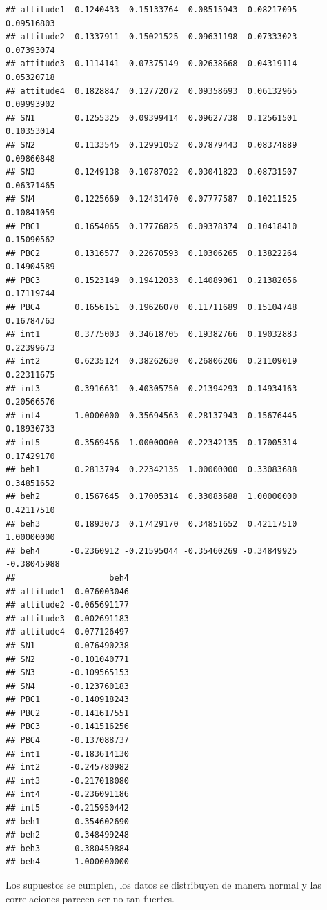 \documentclass[
]{article}
\begin{document}
\begin{verbatim}
## attitude1  0.1240433  0.15133764  0.08515943  0.08217095  0.09516803
## attitude2  0.1337911  0.15021525  0.09631198  0.07333023  0.07393074
## attitude3  0.1114141  0.07375149  0.02638668  0.04319114  0.05320718
## attitude4  0.1828847  0.12772072  0.09358693  0.06132965  0.09993902
## SN1        0.1255325  0.09399414  0.09627738  0.12561501  0.10353014
## SN2        0.1133545  0.12991052  0.07879443  0.08374889  0.09860848
## SN3        0.1249138  0.10787022  0.03041823  0.08731507  0.06371465
## SN4        0.1225669  0.12431470  0.07777587  0.10211525  0.10841059
## PBC1       0.1654065  0.17776825  0.09378374  0.10418410  0.15090562
## PBC2       0.1316577  0.22670593  0.10306265  0.13822264  0.14904589
## PBC3       0.1523149  0.19412033  0.14089061  0.21382056  0.17119744
## PBC4       0.1656151  0.19626070  0.11711689  0.15104748  0.16784763
## int1       0.3775003  0.34618705  0.19382766  0.19032883  0.22399673
## int2       0.6235124  0.38262630  0.26806206  0.21109019  0.22311675
## int3       0.3916631  0.40305750  0.21394293  0.14934163  0.20566576
## int4       1.0000000  0.35694563  0.28137943  0.15676445  0.18930733
## int5       0.3569456  1.00000000  0.22342135  0.17005314  0.17429170
## beh1       0.2813794  0.22342135  1.00000000  0.33083688  0.34851652
## beh2       0.1567645  0.17005314  0.33083688  1.00000000  0.42117510
## beh3       0.1893073  0.17429170  0.34851652  0.42117510  1.00000000
## beh4      -0.2360912 -0.21595044 -0.35460269 -0.34849925 -0.38045988
##                   beh4
## attitude1 -0.076003046
## attitude2 -0.065691177
## attitude3  0.002691183
## attitude4 -0.077126497
## SN1       -0.076490238
## SN2       -0.101040771
## SN3       -0.109565153
## SN4       -0.123760183
## PBC1      -0.140918243
## PBC2      -0.141617551
## PBC3      -0.141516256
## PBC4      -0.137088737
## int1      -0.183614130
## int2      -0.245780982
## int3      -0.217018080
## int4      -0.236091186
## int5      -0.215950442
## beh1      -0.354602690
## beh2      -0.348499248
## beh3      -0.380459884
## beh4       1.000000000
\end{verbatim}

Los supuestos se cumplen, los datos se distribuyen de manera normal y
las correlaciones parecen ser no tan fuertes.
\end{document}
